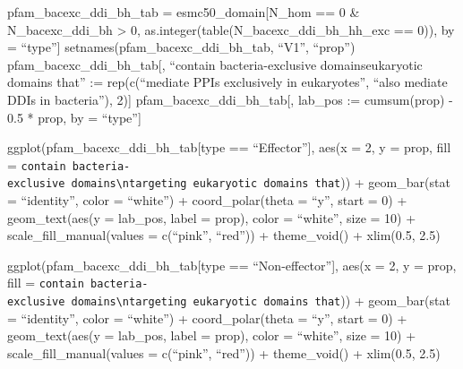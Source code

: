 \documentclass[
]{article}
\begin{document}
pfam\_bacexc\_ddi\_bh\_tab = esmc50\_domain{[}N\_hom == 0 \&
N\_bacexc\_ddi\_bh \textgreater{} 0,
as.integer(table(N\_bacexc\_ddi\_bh\_hh\_exc == 0)), by = ``type''{]}
setnames(pfam\_bacexc\_ddi\_bh\_tab, ``V1'', ``prop'')
pfam\_bacexc\_ddi\_bh\_tab{[}, ``contain bacteria-exclusive
domains\ntargeting eukaryotic domains that'' := rep(c(``mediate PPIs
exclusively in eukaryotes'', ``also mediate DDIs in bacteria''), 2){]}
pfam\_bacexc\_ddi\_bh\_tab{[}, lab\_pos := cumsum(prop) - 0.5 * prop, by
= ``type''{]}

ggplot(pfam\_bacexc\_ddi\_bh\_tab{[}type == ``Effector''{]}, aes(x = 2,
y = prop, fill =
\texttt{contain\ bacteria-exclusive\ domains\textbackslash{}ntargeting\ eukaryotic\ domains\ that}))
+ geom\_bar(stat = ``identity'', color = ``white'') + coord\_polar(theta
= ``y'', start = 0) + geom\_text(aes(y = lab\_pos, label = prop), color
= ``white'', size = 10) + scale\_fill\_manual(values = c(``pink'',
``red'')) + theme\_void() + xlim(0.5, 2.5)

ggplot(pfam\_bacexc\_ddi\_bh\_tab{[}type == ``Non-effector''{]}, aes(x =
2, y = prop, fill =
\texttt{contain\ bacteria-exclusive\ domains\textbackslash{}ntargeting\ eukaryotic\ domains\ that}))
+ geom\_bar(stat = ``identity'', color = ``white'') + coord\_polar(theta
= ``y'', start = 0) + geom\_text(aes(y = lab\_pos, label = prop), color
= ``white'', size = 10) + scale\_fill\_manual(values = c(``pink'',
``red'')) + theme\_void() + xlim(0.5, 2.5)
\end{document}
